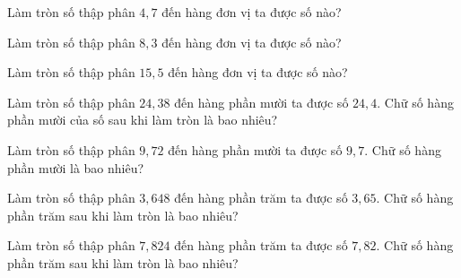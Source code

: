 
\begin{ex}
  Làm tròn số thập phân $4{,}7$ đến hàng đơn vị ta được số nào?
\end{ex}

\begin{ex}
  Làm tròn số thập phân $8{,}3$ đến hàng đơn vị ta được số nào?
\end{ex}

\begin{ex}
  Làm tròn số thập phân $15{,}5$ đến hàng đơn vị ta được số nào?
\end{ex}

\begin{ex}
  Làm tròn số thập phân $24{,}38$ đến hàng phần mười ta được số $24{,}4$. Chữ số hàng phần mười của số sau khi làm tròn là bao nhiêu?
\end{ex}

\begin{ex}
  Làm tròn số thập phân $9{,}72$ đến hàng phần mười ta được số $9{,}7$. Chữ số hàng phần mười là bao nhiêu?
\end{ex}

\begin{ex}
  Làm tròn số thập phân $3{,}648$ đến hàng phần trăm ta được số $3{,}65$. Chữ số hàng phần trăm sau khi làm tròn là bao nhiêu?
\end{ex}

\begin{ex}
  Làm tròn số thập phân $7{,}824$ đến hàng phần trăm ta được số $7{,}82$. Chữ số hàng phần trăm sau khi làm tròn là bao nhiêu?
\end{ex}

